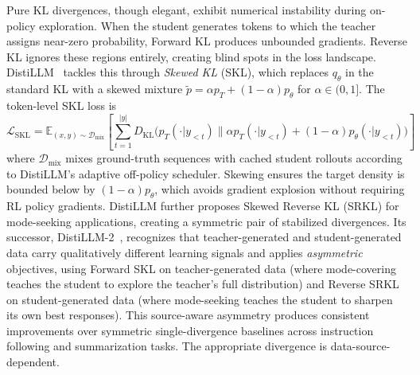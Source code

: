 \documentclass{article} %
\newcommand{\E}{\mathbb{E}}
\newcommand{\KL}{D_{\mathrm{KL}}}
\newcommand{\ptheta}{p_\theta}
\newcommand{\pteacher}{p_T}
\newcommand{\loss}{\mathcal{L}}
\begin{document}
Pure KL divergences, though elegant, exhibit numerical instability during on-policy exploration. When the student generates tokens to which the teacher assigns near-zero probability, Forward KL produces unbounded gradients. Reverse KL ignores these regions entirely, creating blind spots in the loss landscape. DistiLLM~\citep{2402.03898} tackles this through \emph{Skewed KL} (SKL), which replaces $q_\theta$ in the standard KL with a skewed mixture $\tilde{p} = \alpha \pteacher + (1-\alpha)\ptheta$ for $\alpha \in (0,1]$. The token-level SKL loss is
\begin{equation*}
    \loss_{\text{SKL}} = \E_{(x,y) \sim \mathcal{D}_{\text{mix}}} \left[ \sum_{t=1}^{|y|} \KL\big(\pteacher(\cdot|y_{<t}) \parallel \alpha \pteacher(\cdot|y_{<t}) + (1-\alpha) \ptheta(\cdot|y_{<t})\big) \right]
\end{equation*}
where $\mathcal{D}_{\text{mix}}$ mixes ground-truth sequences with cached student rollouts according to DistiLLM's adaptive off-policy scheduler.
Skewing ensures the target density is bounded below by $(1-\alpha)\ptheta$, which avoids gradient explosion without requiring RL policy gradients. DistiLLM further proposes Skewed Reverse KL (SRKL) for mode-seeking applications, creating a symmetric pair of stabilized divergences. Its successor, DistiLLM-2~\citep{2503.07067}, recognizes that teacher-generated and student-generated data carry qualitatively different learning signals and applies \emph{asymmetric} objectives, using Forward SKL on teacher-generated data (where mode-covering teaches the student to explore the teacher's full distribution) and Reverse SRKL on student-generated data (where mode-seeking teaches the student to sharpen its own best responses). This source-aware asymmetry produces consistent improvements over symmetric single-divergence baselines across instruction following and summarization tasks. The appropriate divergence is data-source-dependent.
\end{document}
